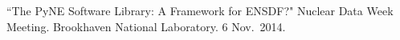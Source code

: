\begin{bibsection}








\item ``The PyNE Software Library: A Framework for ENSDF?" Nuclear Data Week Meeting. Brookhaven National Laboratory. 6 Nov.\ 2014. 




\end{bibsection}
